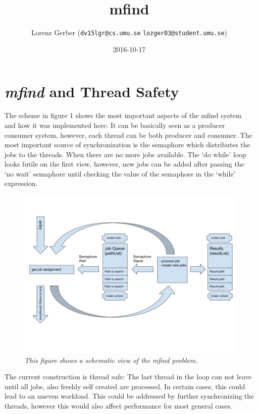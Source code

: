 \documentclass[a4paper,11pt,twoside]{article}
\title{mfind}
\author{Lorenz Gerber ({\tt{dv15lgr@cs.umu.se}} {\tt{lozger03@student.umu.se}})}
\date{2016-10-17}
\begin{document}
\lstset{language=C}
\maketitle
\thispagestyle{empty}
\newpage
\tableofcontents
\thispagestyle{empty}
\newpage

\clearpage
{}

\section{\textit{mfind} and Thread Safety} 

The scheme in figure 1 shows the most important aspects of the mfind system and how it was implemented here. It can be basically seen as a producer consumer system, however, each thread can be both producer and consumer. The most important source of synchronization is the semaphore which distributes the jobs to the threads. When there are no more jobs available. The `do while' loop looks futile on the first view, however, new jobs can be added after passing the `no wait' semaphore until checking the value of the semaphore in the `while' expression.

\begin{figure}
\centering
\includegraphics[width=\textwidth]{schema.png}
\caption{\textit{This figure shows a schematic view of the mfind problem.}}
\label{fig:scheme}
\end{figure}

The current construction is thread safe: The last thread in the loop can not leave until all jobs, also freshly self created are processed. In certain cases, this could lead to an uneven workload. This could be addressed by further synchronizing the threads, however this would also affect performance for most general cases. 
\end{document}
